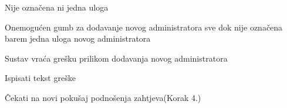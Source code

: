 \begin{packed_item}
\begin{packed_item}
							\item[3.a] Nije označena ni jedna uloga
							\item[] \begin{packed_enum}
								
								\item Onemogućen gumb za dodavanje novog administratora sve dok nije označena barem jedna uloga novog administratora
								
							\end{packed_enum}
							
							\item[4.a] Sustav vraća grešku prilikom dodavanja novog administratora
							\item[] \begin{packed_enum}
								
								\item Ispisati tekst greške
								\item Čekati na novi pokušaj podnošenja zahtjeva(Korak 4.)
								
							\end{packed_enum}
							
						\end{packed_item}
					\end{packed_item}
					
